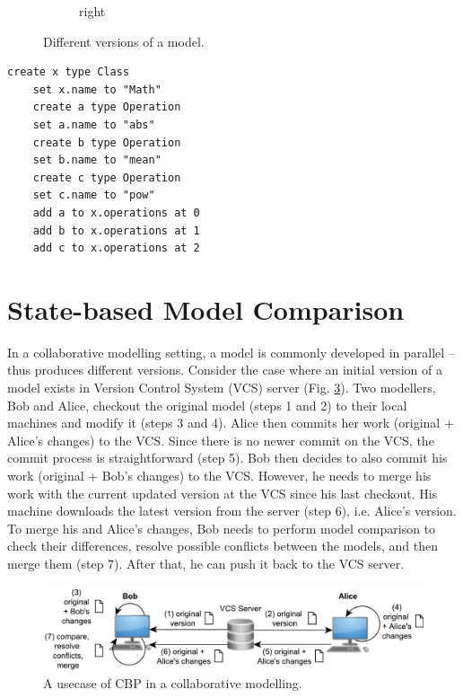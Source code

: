 \documentclass{jot}
\begin{document}
\begin{minipage}[t]{0.61\linewidth}
\begin{figure}[H]
\begin{subfigure}[t]{0.2\linewidth}
            \caption{right}
            \label{fig:right}
        \end{subfigure}
        \hfill
        \label{fig:versions}
        \caption{Different versions of a model.}
    \end{figure}
\end{minipage}
\hfill
\begin{minipage}[t]{0.37\linewidth}
    \begin{lstlisting}[style=eol,numbersep=0.6pt,caption={The pseudo-formatted CBP of the model in Fig. \ref{fig:origin}.},label=lst:origincbp]
    create x type Class
    set x.name to "Math" 
    create a type Operation
    set a.name to "abs" 
    create b type Operation
    set b.name to "mean" 
    create c type Operation
    set c.name to "pow" 
    add a to x.operations at 0
    add b to x.operations at 1
    add c to x.operations at 2
    \end{lstlisting}
\end{minipage}

\vspace{-5pt}
\section{State-based Model Comparison}
\label{sec:model_comparison}

\vspace{-5pt}
In a collaborative modelling setting, a model is commonly developed in parallel -- thus produces different versions.
Consider the case where an initial version of a model exists in Version Control System (VCS) server (Fig. \ref{fig:vcs}).
Two modellers, Bob and Alice, checkout the original model (steps 1 and 2) to their local machines and modify it (steps 3 and 4).
Alice then commits her work (original + Alice's changes) to the VCS.
Since there is no newer commit on the VCS, the commit process is straightforward (step 5).
Bob then decides to also commit his work (original + Bob's changes) to the VCS.
However, he needs to merge his work with the current updated version at the VCS since his last checkout.
His machine downloads the latest version from the server (step 6), i.e. Alice's version.
To merge his and Alice's changes, Bob needs to perform model comparison to check their differences, resolve possible conflicts between the models, and then merge them (step 7).
After that, he can push it back to the VCS server.

\begin{figure}[ht]
    \includegraphics[width=\linewidth]{VCS}
    \caption{A usecase of CBP in a collaborative modelling.}
    \label{fig:vcs}
\end{figure}
\end{document}
